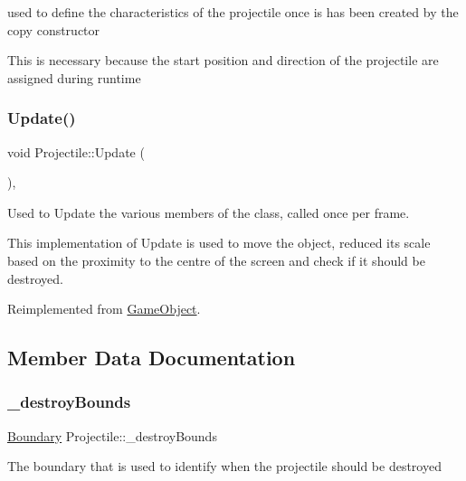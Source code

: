used to define the characteristics of the projectile once is has been created by the copy constructor 

This is necessary because the start position and direction of the projectile are assigned during runtime \mbox{\label{class_projectile_a1f9df5dd65fed410d4e897eb63edc1c9}} 
\subsubsection{\texorpdfstring{Update()}{Update()}}
{\footnotesize\ttfamily void Projectile\+::\+Update (\begin{DoxyParamCaption}{ }\end{DoxyParamCaption})\hspace{0.3cm}{\ttfamily [final]}, {\ttfamily [virtual]}}



Used to Update the various members of the class, called once per frame. 

This implementation of Update is used to move the object, reduced its scale based on the proximity to the centre of the screen and check if it should be destroyed. 

Reimplemented from \hyperlink{class_game_object_ac7ecc123dacaba955077420caabf5e64}{Game\+Object}.



\subsection{Member Data Documentation}
\mbox{\label{class_projectile_a2904a8119d6703c781e4d54c345b75b7}} 
\subsubsection{\texorpdfstring{\+\_\+destroy\+Bounds}{\_destroyBounds}}
{\footnotesize\ttfamily \hyperlink{class_boundary}{Boundary} Projectile\+::\+\_\+destroy\+Bounds\hspace{0.3cm}{\ttfamily [protected]}}

The boundary that is used to identify when the projectile should be destroyed \mbox{\label{class_projectile_afd6f6c2b3c202adb129a9cbfcd62ea1f}} 
